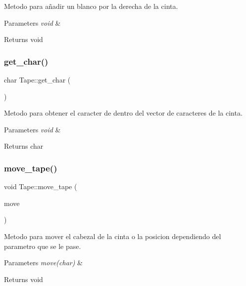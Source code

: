 Metodo para añadir un blanco por la derecha de la cinta. 


\begin{DoxyParams}{Parameters}
{\em void} & \\
\hline
\end{DoxyParams}
\begin{DoxyReturn}{Returns}
void 
\end{DoxyReturn}
\hypertarget{class_tape_a6b31f4a92b882a2adf51b96d2b03c437}{}\label{class_tape_a6b31f4a92b882a2adf51b96d2b03c437} 
\subsubsection{\texorpdfstring{get\+\_\+char()}{get\_char()}}
{\footnotesize\ttfamily char Tape\+::get\+\_\+char (\begin{DoxyParamCaption}\item[{void}]{ }\end{DoxyParamCaption})}



Metodo para obtener el caracter de dentro del vector de caracteres de la cinta. 


\begin{DoxyParams}{Parameters}
{\em void} & \\
\hline
\end{DoxyParams}
\begin{DoxyReturn}{Returns}
char 
\end{DoxyReturn}
\hypertarget{class_tape_a66ca6d38274b63476f8b7313a7de6de2}{}\label{class_tape_a66ca6d38274b63476f8b7313a7de6de2} 
\subsubsection{\texorpdfstring{move\+\_\+tape()}{move\_tape()}}
{\footnotesize\ttfamily void Tape\+::move\+\_\+tape (\begin{DoxyParamCaption}\item[{char}]{move }\end{DoxyParamCaption})}



Metodo para mover el cabezal de la cinta o la posicion dependiendo del parametro que se le pase. 


\begin{DoxyParams}{Parameters}
{\em move(char)} & \\
\hline
\end{DoxyParams}
\begin{DoxyReturn}{Returns}
void 
\end{DoxyReturn}
\hypertarget{class_tape_ae7b2c05c9abe984b55fb337c2a12f37d}{}\label{class_tape_ae7b2c05c9abe984b55fb337c2a12f37d} 
